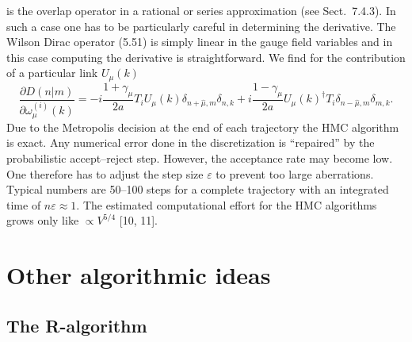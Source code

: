 is the overlap operator in a rational or series approximation (see
Sect.~7.4.3). In such a case one has to be particularly careful in determining
the derivative.
The Wilson Dirac operator (5.51) is simply linear in the gauge field variables
and in this case computing the derivative is straightforward. We find for the
contribution of a particular link $U_\mu(k)$
\begin{equation}
\frac{\partial D(n|m)}{\partial\omega_\mu^{(i)}(k)}
= -i\frac{1+\gamma_\mu}{2a}T_iU_\mu(k)\delta_{n+\hat{\mu},m}\delta_{n,k}
  + i\frac{1-\gamma_\mu}{2a}U_\mu(k)^\dagger T_i\delta_{n-\hat{\mu},m}\delta_{m,k}.
\end{equation}
Due to the Metropolis decision at the end of each trajectory the HMC algorithm
is exact. Any numerical error done in the discretization is ``repaired'' by the
probabilistic accept--reject step. However, the acceptance rate may become low.
One therefore has to adjust the step size $\varepsilon$ to prevent too large
aberrations. Typical numbers are 50--100 steps for a complete trajectory with
an integrated time of $n\varepsilon \approx 1$. The estimated computational
effort for the HMC algorithms grows only like $\propto V^{5/4}$ [10, 11].

\section{Other algorithmic ideas}

\subsection{The R-algorithm}

